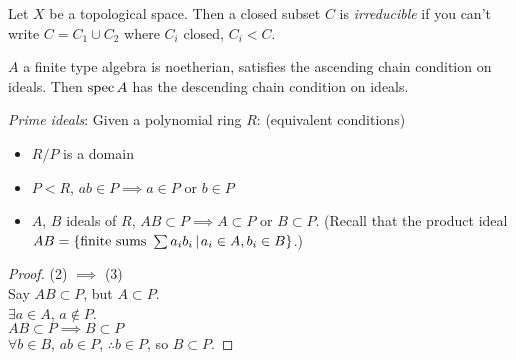 \documentclass [letterpaper,11pt,twoside]{article}
\begin{document}
    \begin{defn*}
      Let $X$ be a topological space.  Then a closed subset $C$ is \emph{irreducible} if you can't write $C = C_1 \cup C_2$ where $C_i$ closed, $C_i < C$.
    \end{defn*}

    $A$ a finite type algebra is noetherian, satisfies the ascending chain condition on ideals.  Then $\operatorname{spec} A$ has the descending chain condition on ideals.

    \noindent \emph{Prime ideals}: Given a polynomial ring $R$: (equivalent conditions)
    \begin{itemize}
      \item $R / P$ is a domain
      \item $P < R$, $ab\in P \implies a \in P$ or $b\in P$
      \item $A$, $B$ ideals of $R$, $AB \subset P \implies A \subset P$ or $B \subset P$.  (Recall that the product ideal $AB  = \mathset[\text{finite sums }\sum a_i b_i]{a_i\in A, b_i\in B}$.)
    \end{itemize}
    \begin{proof}
      (2) $\implies$ (3) \\
      Say $AB \subset P$, but $A \subset P$. \\
      $\exists a\in A$, $a\notin P$. \\
      $AB \subset P \implies B \subset P$ \\
      $\forall b\in B$, $ab\in P$, $\therefore b\in P$, so $B\subset P$.
    \end{proof}
\end{document}
